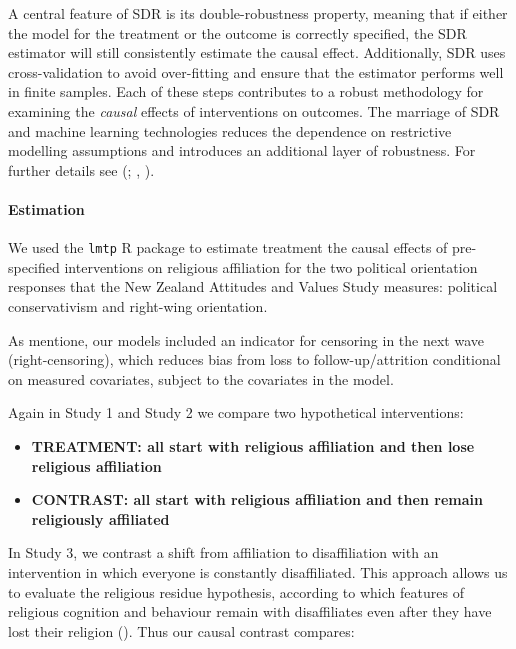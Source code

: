 \documentclass[
  singlecolumn]{article}
\let\oldparagraph\paragraph
\renewcommand{\paragraph}[1]{\oldparagraph{#1}\mbox{}}
\begin{document}
A central feature of SDR is its double-robustness property, meaning that
if either the model for the treatment or the outcome is correctly
specified, the SDR estimator will still consistently estimate the causal
effect. Additionally, SDR uses cross-validation to avoid over-fitting
and ensure that the estimator performs well in finite samples. Each of
these steps contributes to a robust methodology for examining the
\emph{causal} effects of interventions on outcomes. The marriage of SDR
and machine learning technologies reduces the dependence on restrictive
modelling assumptions and introduces an additional layer of robustness.
For further details see (; ,
).

\paragraph{Estimation}\label{estimation}

We used the \texttt{lmtp} R package to estimate treatment the causal
effects of pre-specified interventions on religious affiliation for the
two political orientation responses that the New Zealand Attitudes and
Values Study measures: political conservativism and right-wing
orientation.

As mentione, our models included an indicator for censoring in the next
wave (right-censoring), which reduces bias from loss to
follow-up/attrition conditional on measured covariates, subject to the
covariates in the model.

Again in Study 1 and Study 2 we compare two hypothetical interventions:

\begin{itemize}
\item
  \textbf{TREATMENT: all start with religious affiliation and then lose
  religious affiliation}
\item
  \textbf{CONTRAST: all start with religious affiliation and then remain
  religiously affiliated}
\end{itemize}

In Study 3, we contrast a shift from affiliation to disaffiliation with
an intervention in which everyone is constantly disaffiliated. This
approach allows us to evaluate the religious residue hypothesis,
according to which features of religious cognition and behaviour remain
with disaffiliates even after they have lost their religion
(). Thus
our causal contrast compares:
\end{document}
